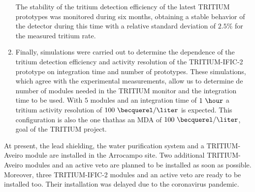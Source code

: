 \begin{enumerate}
The stability of the tritium detection efficiency of the latest TRITIUM prototypes was monitored during six months, obtaining a stable behavior of the detector during this time with a relative standard deviation of $2.5\%$ for the measured tritium rate. 

\item{} Finally, simulations were carried out to determine the dependence of the tritium detection efficiency and activity resolution of the TRITIUM-IFIC-2 prototype on integration time and number of prototypes. These simulations, which agree with the experimental measurements, allow us to determine de number of modules needed in the TRITIUM monitor and the integration time to be used. With $5$ modules and an integration time of $1~\hour$ a tritium activity resolution of $100~\becquerel/\liter$ is expected. This configuration is also the one thathas an MDA of $100~\becquerel/\liter$, goal of the TRITIUM project.


\end{enumerate}

At present, the lead shielding, the water purification system and a TRITIUM-Aveiro module are installed in the Arrocampo site. Two additional TRITIUM-Aveiro modules and an active veto are planned to be installed as soon as possible. Moreover, three TRITIUM-IFIC-2 modules and an active veto are ready to be installed too. Their installation was delayed due to the coronavirus pandemic.